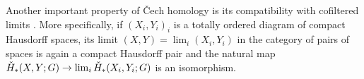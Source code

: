 Another important property of \v{C}ech homology is its compatibility with cofiltered limits \cite[Theorems VIII.3.6.\@ and X.3.1.]{MR0050886}. More specifically, if $(X_i, Y_i)_i$ is a totally ordered diagram of compact Hausdorff spaces, its limit $(X, Y) = \lim_i (X_i, Y_i)$ in the category of pairs of spaces is again a compact Hausdorff pair and the natural map $\check{H}_*(X, Y; G) \to \lim_i \check{H}_*(X_i, Y_i; G)$ is an isomorphism.




